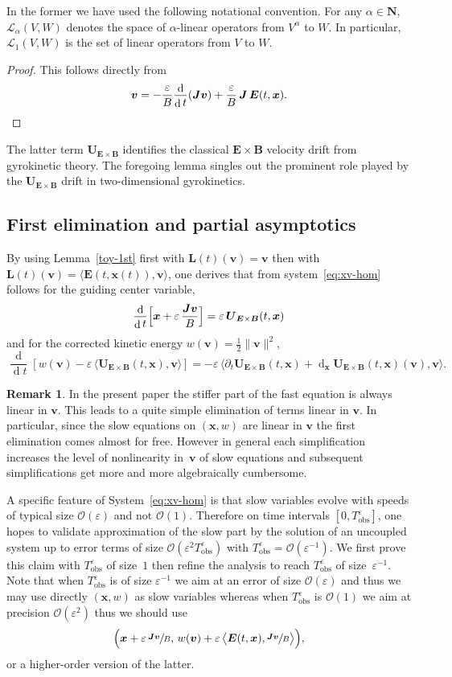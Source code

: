 \documentclass[10pt]{amsart}
\let\mathcal\mathscr
\newcommand{\blangle}{\bigl\langle}
\newcommand{\brangle}{\bigr\rangle}
\let\eps\varepsilon
\let\d\partial
\DeclareMathOperator\dD{d}\let\dd\dD
\theoremstyle{plain}
\theoremstyle{definition}
\newtheorem{remark}[theorem]{Remark}
\newcommand\br{\begin{remark}}
\newcommand\er{\end{remark}}
\newcommand{\be}{\begin{equation}}
\newcommand{\ee}{\end{equation}}
\newcommand{\N}{\mathbf N}
\newcommand\bB{{\boldsymbol B}}
\newcommand\bE{{\boldsymbol E}}
\newcommand\bJ{{\boldsymbol J}}
\newcommand\bL{{\boldsymbol L}}
\newcommand\bU{{\boldsymbol U}}
\newcommand\bfv{{\boldsymbol v}}
\newcommand\bfx{{\boldsymbol x}}
\newcommand\cL{{\mathcal L}}
\newcommand\cO{{\mathcal O}}
\let\e w
\newcommand{\EcB}{\bU_{\bE\times\bB}}
\newcommand{\tobs}{T_{\mathrm{obs}}}
\begin{document}
In the former we have used the following notational convention. For any \hbox{$\alpha\in\N$}, $\cL_\alpha(V,W)$ denotes the space of $\alpha$-linear operators from
$V^\alpha$ to $W$. In particular, $\cL_1(V,W)$ is the set of linear operators from $V$ to $W$.

\begin{proof}
This follows directly from
\[
\bfv=
-\frac{\eps}{B}\frac{\dD}{\dD t}(\bJ\bfv)+\frac{\eps}{B}\,\bJ\,\bE(t,\bfx).\qedhere
\]
\end{proof}

The latter term $\EcB$ identifies the classical $\bE\times\bB$ velocity drift from gyrokinetic theory. The foregoing lemma singles out the prominent role played by the $\EcB$ drift in two-dimensional gyrokinetics.

\subsection{First elimination and partial asymptotics}

By using Lemma~\ref{toy-1st} first with $\bL(t)(\bfv)=\bfv$ then
with $\bL(t)(\bfv)=\langle\bE(t,\bfx(t)),\bfv\rangle$, one derives
that from system~\eqref{eq:xv-hom} follows for the guiding center
variable,
\be
\label{toy-x1}
\frac{\dD}{\dD t}\Bigl[\bfx
+\eps\,\frac{\bJ\bfv}{B}\Bigr]
= \eps\,\EcB(t,\bfx)
\ee
and for the corrected kinetic energy $\e(\bfv)=\frac{1}{2}\|\bfv\|^2$,
\be
\label{toy-e1}
\frac{\dD}{\dD t}\left[\e(\bfv)-
\eps\,\blangle\EcB(t,\bfx),\bfv\brangle\right]
=
-\eps\,\blangle\d_t\EcB(t,\bfx)
+\dD_\bfx\EcB(t,\bfx)(\bfv),\bfv\brangle.
\ee

\br
In the present paper the stiffer part of the fast equation is always linear in $\bfv$. This leads to a quite simple elimination of terms linear in $\bfv$. In particular, since the slow equations on $(\bfx,\e)$ are linear in $\bfv$ the first elimination comes almost for free. However in general each simplification increases the level of nonlinearity in~$\bfv$ of slow equations and subsequent simplifications get more and more algebraically cumbersome.
\er

A specific feature of System~\eqref{eq:xv-hom} is that slow variables evolve with speeds of typical size $\cO(\eps)$ and not $\cO(1)$. Therefore on time intervals $[0,\tobs^\eps]$, one hopes to validate approximation of the slow part by the solution of an uncoupled system up to error terms of size $\cO(\eps^2\tobs^\eps)$ with $\tobs^\eps=\cO(\eps^{-1})$. We first prove this claim with $\tobs^\eps$ of size~$1$ then refine the analysis to reach $\tobs^\eps$ of size~$\eps^{-1}$. Note that when $\tobs^\eps$ is of size $\eps^{-1}$ we aim at an error of size $\cO(\eps)$ and thus we may use directly $(\bfx,w)$ as slow variables whereas when $\tobs^\eps$ is $\cO(1)$ we aim at precision $\cO(\eps^2)$ thus we should use
\[
\Bigl(\bfx+\eps\, \sfrac{\bJ\bfv}{B},\,\e(\bfv)+
\eps\,\blangle\bE(t,\bfx),\sfrac{\bJ\bfv}{B}\brangle\Bigr),
\]
or a higher-order version of the latter.
\end{document}
